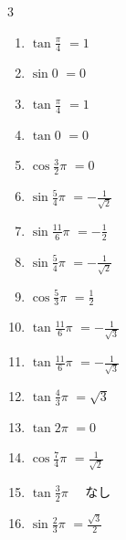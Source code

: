 \begin{multicols}{3}
\begin{enumerate}
  \item $\displaystyle \tan{\frac{\pi}{4}}$
        $\displaystyle =1$

  \item $\displaystyle \sin{0}$
        $\displaystyle =0$

  \item $\displaystyle \tan{\frac{\pi}{4}}$
        $\displaystyle =1$

  \item $\displaystyle \tan{0}$
        $\displaystyle =0$

  \item $\displaystyle \cos{\frac{3}{2}\pi}$
        $\displaystyle =0$

  \item $\displaystyle \sin{\frac{5}{4}\pi}$
        $\displaystyle =-\frac{1}{\sqrt{2}}$

  \item $\displaystyle \sin{\frac{11}{6}\pi}$
        $\displaystyle =-\frac{1}{2}$

  \item $\displaystyle \sin{\frac{5}{4}\pi}$
        $\displaystyle =-\frac{1}{\sqrt{2}}$

  \item $\displaystyle \cos{\frac{5}{3}\pi}$
        $\displaystyle =\frac{1}{2}$

  \item $\displaystyle \tan{\frac{11}{6}\pi}$
        $\displaystyle =-\frac{1}{\sqrt{3}}$

  \item $\displaystyle \tan{\frac{11}{6}\pi}$
        $\displaystyle =-\frac{1}{\sqrt{3}}$

  \item $\displaystyle \tan{\frac{4}{3}\pi}$
        $\displaystyle =\sqrt{3}$

  \item $\displaystyle \tan{2\pi}$
        $\displaystyle =0$

  \item $\displaystyle \cos{\frac{7}{4}\pi}$
        $\displaystyle =\frac{1}{\sqrt{2}}$

  \item $\displaystyle \tan{\frac{3}{2}\pi}$
        $\displaystyle \quad なし$

\columnbreak %

  \item $\displaystyle \sin{\frac{2}{3}\pi}$
        $\displaystyle =\frac{\sqrt{3}}{2}$


\end{enumerate}
\end{multicols}
